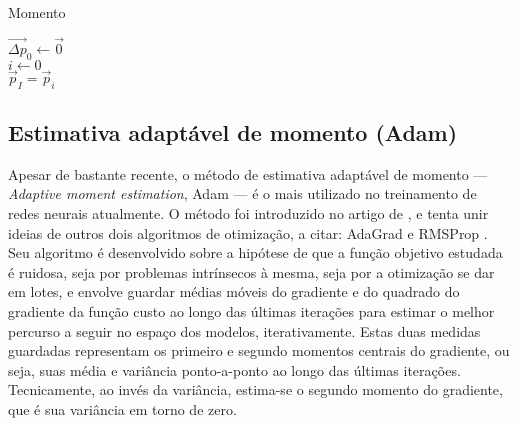       \begin{algorithm}
        \caption{Momento} \label{alg:momento}
        \Entrada{$\alpha \in [0,1[$: taxa de decaimento exponencial}
        \BlankLine
        $\vec{\Delta p}_0 \gets \vec{0}$ \\
        $i \gets 0$ \\
        $\vec{p}_I = \vec{p}_i$
      \end{algorithm}


    \subsection{Estimativa adaptável de momento (Adam)} \label{s:adam}

      Apesar de bastante recente, o método de estimativa adaptável de momento --- \textit{Adaptive moment estimation}, Adam --- é o mais utilizado no treinamento de redes neurais atualmente. O método foi introduzido no artigo de , e tenta unir ideias de outros dois algoritmos de otimização, a citar: AdaGrad  e RMSProp . Seu algoritmo é desenvolvido sobre a hipótese de que a função objetivo estudada é ruidosa, seja por problemas intrínsecos à mesma, seja por a otimização se dar em lotes, e envolve guardar médias móveis do gradiente e do quadrado do gradiente da função custo ao longo das últimas iterações para estimar o melhor percurso a seguir no espaço dos modelos, iterativamente. Estas duas medidas guardadas representam os primeiro e segundo momentos centrais do gradiente, ou seja, suas média e variância ponto-a-ponto ao longo das últimas iterações. Tecnicamente, ao invés da variância, estima-se o segundo momento do gradiente, que é sua variância em torno de zero.

